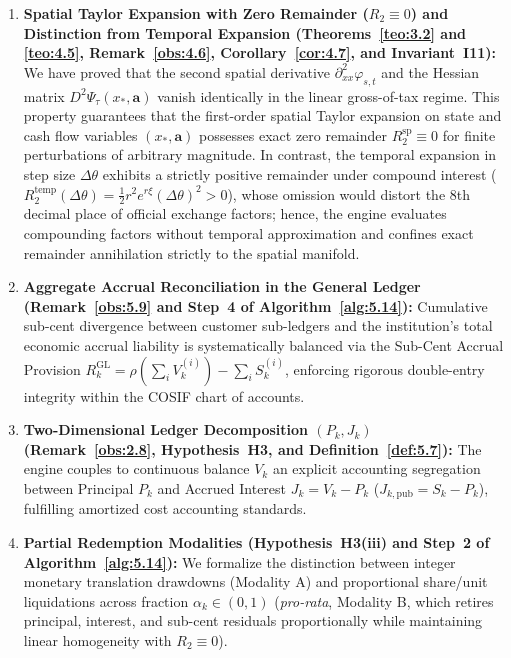 \documentclass[11pt, a4paper]{article}
\theoremstyle{definition}
\theoremstyle{plain}
\theoremstyle{remark}
\begin{document}
\begin{enumerate}[label=\textbf{\arabic*.}]
    \item \textbf{Spatial Taylor Expansion with Zero Remainder ($R_2 \equiv 0$) and Distinction from Temporal Expansion (Theorems~\ref{teo:3.2} and \ref{teo:4.5}, Remark~\ref{obs:4.6}, Corollary~\ref{cor:4.7}, and Invariant~I11):} We have proved that the second spatial derivative $\partial_{xx}^2 \varphi_{s,t}$ and the Hessian matrix $D^2 \Psi_\tau(x_*, \mathbf{a})$ vanish identically in the linear gross-of-tax regime. This property guarantees that the first-order spatial Taylor expansion on state and cash flow variables $(x_*, \mathbf{a})$ possesses exact zero remainder $R_2^{\text{sp}} \equiv 0$ for finite perturbations of arbitrary magnitude. In contrast, the temporal expansion in step size $\Delta\theta$ exhibits a strictly positive remainder under compound interest ($R_2^{\text{temp}}(\Delta\theta) = \frac{1}{2}r^2 e^{r\xi}(\Delta\theta)^2 > 0$), whose omission would distort the 8th decimal place of official exchange factors; hence, the engine evaluates compounding factors without temporal approximation and confines exact remainder annihilation strictly to the spatial manifold.
    \item \textbf{Aggregate Accrual Reconciliation in the General Ledger (Remark~\ref{obs:5.9} and Step~4 of Algorithm~\ref{alg:5.14}):} Cumulative sub-cent divergence between customer sub-ledgers and the institution's total economic accrual liability is systematically balanced via the Sub-Cent Accrual Provision $R_k^{\text{GL}} = \rho(\sum_i V_k^{(i)}) - \sum_i S_k^{(i)}$, enforcing rigorous double-entry integrity within the COSIF chart of accounts.
    \item \textbf{Two-Dimensional Ledger Decomposition $(P_k, J_k)$ (Remark~\ref{obs:2.8}, Hypothesis~H3, and Definition~\ref{def:5.7}):} The engine couples to continuous balance $V_k$ an explicit accounting segregation between Principal $P_k$ and Accrued Interest $J_k = V_k - P_k$ ($J_{k,\text{pub}} = S_k - P_k$), fulfilling amortized cost accounting standards.
    \item \textbf{Partial Redemption Modalities (Hypothesis~H3(iii) and Step~2 of Algorithm~\ref{alg:5.14}):} We formalize the distinction between integer monetary translation drawdowns (Modality A) and proportional share/unit liquidations across fraction $\alpha_k \in (0, 1)$ (\emph{pro-rata}, Modality B, which retires principal, interest, and sub-cent residuals proportionally while maintaining linear homogeneity with $R_2 \equiv 0$).

\end{enumerate}
\end{document}

